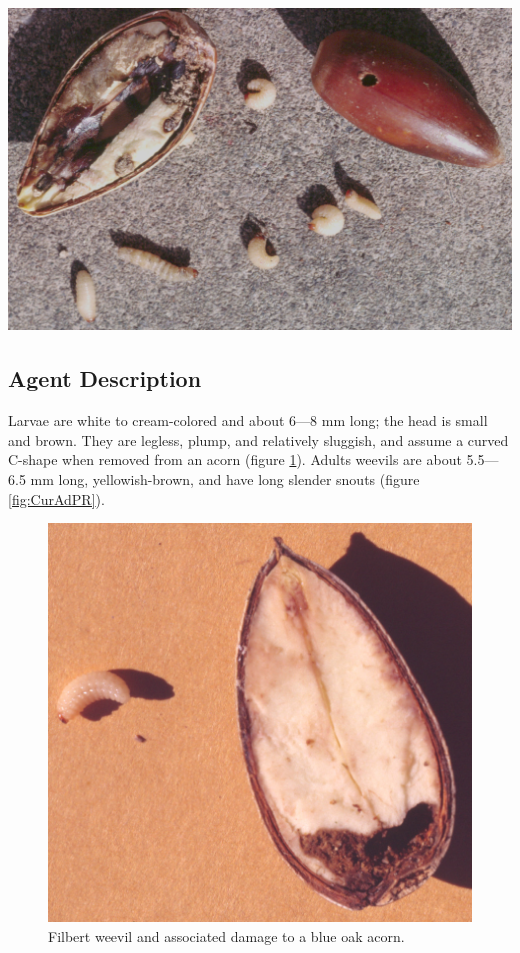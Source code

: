 \documentclass[
]{book}
\begin{document}
\begin{center}\includegraphics[width=0.8\linewidth]{images/Insect-acorn/CurCydlat_QL_PR_11-99} \end{center}

\subsection*{Agent Description}\label{agent-description}

Larvae are white to cream-colored and about 6---8 mm long; the head is small and brown. They are legless, plump, and relatively sluggish, and assume a curved C-shape when removed from an acorn (figure \ref{fig:CupaQdPR}). Adults weevils are about 5.5---6.5 mm long, yellowish-brown, and have long slender snouts (figure \ref{fig:CurAdPR}).



\begin{figure}

{\centering \includegraphics[width=0.8\linewidth]{images/Insect-acorn/Curpar_QUDO_PR_9-89scan} 

}

\caption{Filbert weevil and associated damage to a blue oak acorn.}\label{fig:CupaQdPR}
\end{figure}
\end{document}

